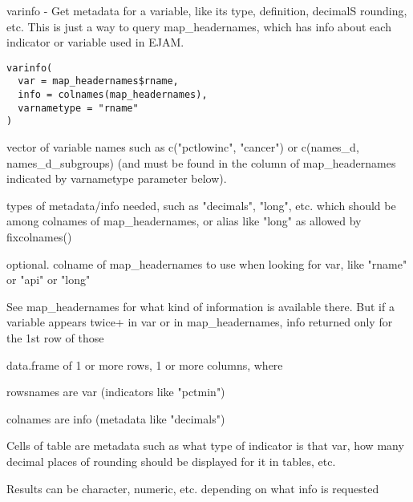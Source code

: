 \documentclass[a4paper]{book}
\begin{document}
%
\begin{Description}\relax
varinfo - Get metadata for a variable, like its type, definition, decimalS rounding, etc.
This is just a way to query map\_headernames, which has info about each indicator or
variable used in EJAM.
\end{Description}
%
\begin{Usage}
\begin{verbatim}
varinfo(
  var = map_headernames$rname,
  info = colnames(map_headernames),
  varnametype = "rname"
)
\end{verbatim}
\end{Usage}
%
\begin{Arguments}
\begin{ldescription}
\item[\code{var}] vector of variable names such as c("pctlowinc", "cancer") or c(names\_d, names\_d\_subgroups)
(and must be found in the column of map\_headernames indicated by varnametype parameter below).

\item[\code{info}] types of metadata/info needed, such as "decimals", "long", etc.
which should be among colnames of map\_headernames,
or alias like "long" as allowed by fixcolnames()

\item[\code{varnametype}] optional. colname of map\_headernames to use when looking for var,
like "rname" or "api" or "long"
\end{ldescription}
\end{Arguments}
%
\begin{Details}\relax
See map\_headernames for what kind of information is available there.
But if a variable appears twice+ in var or in map\_headernames, info returned only for the 1st row of those
\end{Details}
%
\begin{Value}
data.frame of 1 or more rows, 1 or more columns, where

rowsnames are var (indicators like "pctmin")

colnames are info (metadata   like "decimals")

Cells of table are metadata such as what type of indicator is that var, how many
decimal places of rounding should be displayed for it in tables, etc.

Results can be character, numeric, etc. depending on what info is requested
\end{Value}
\end{document}
